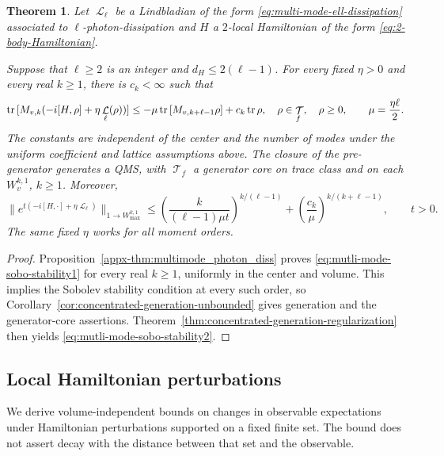 \documentclass[11pt]{article}
\theoremstyle{myplain}
\newtheorem{thm}{Theorem}[section]
\theoremstyle{mydefinition}
\theoremstyle{remark}
\DeclareMathOperator{\cL}{\mathcal{L}}
\DeclareMathOperator{\cT}{\mathcal{T}}
\DeclareMathOperator{\1}{\mathds{1}}
\newcommand{\tr}[1][]{\operatorname{tr}%
  \ifx#1\empty \else \left[ #1 \right] \fi}
\begin{document}
        \begin{thm}\label{thm:multimode_photon_diss}
            Let $\cL_\ell$ be a Lindbladian of the form \eqref{eq:multi-mode-ell-dissipation} associated to $\ell$-photon-dissipation and $H$ a $2$-local Hamiltonian of the form \eqref{eq:2-body-Hamiltonian}.
            
            Suppose that $\ell \geq 2$ is an integer and $d_H\le2(\ell-1)$. For every fixed $\eta>0$ and every real $k\ge1$, there is $c_k<\infty$ such that
            \begin{equation}\label{eq:mutli-mode-sobo-stability1}
                \tr[M_{v,k}(-i[H,\rho]+\eta\cL_\ell(\rho))]
                \le-\mu\tr[M_{v,k+\ell-1}\rho]+c_k\tr\rho,
                \quad \rho\in\cT_f,\quad\rho\ge0,
                \qquad\mu=\frac{\eta\ell}{2}.
            \end{equation}
            The constants are independent of the center and the number of modes under the uniform coefficient and lattice assumptions above. The closure of the pre-generator generates a QMS, with $\cT_f$ a generator core on trace class and on each $W_v^{k,1}$, $k\ge1$. Moreover,
            \begin{equation}\label{eq:mutli-mode-sobo-stability2}
                \|e^{t(-i[H,\cdot]+\eta\cL_\ell)}\|_{1\to W_{\max}^{k,1}}
                \le\left(\frac{k}{(\ell-1)\mu t}\right)^{k/(\ell-1)}
                +\left(\frac{c_k}{\mu}\right)^{k/(k+\ell-1)},\qquad t>0.
            \end{equation}
            The same fixed $\eta$ works for all moment orders.
            
        \end{thm}
        \begin{proof}
            Proposition~\ref{appx-thm:multimode_photon_diss} proves \eqref{eq:mutli-mode-sobo-stability1} for every real $k \ge 1$, uniformly in the center and volume. This implies the Sobolev stability condition at every such order, so Corollary~\ref{cor:concentrated-generation-unbounded} gives generation and the generator-core assertions. Theorem~\ref{thm:concentrated-generation-regularization} then yields \eqref{eq:mutli-mode-sobo-stability2}.
        \end{proof}

    \subsection{Local Hamiltonian perturbations}
        We derive volume-independent bounds on changes in observable expectations under Hamiltonian perturbations supported on a fixed finite set. The bound does not assert decay with the distance between that set and the observable.
\end{document}
